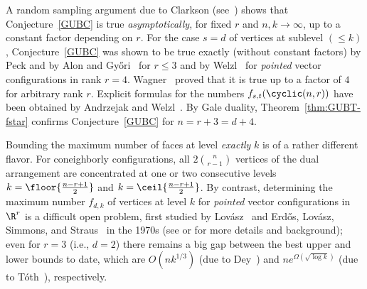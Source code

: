 A random sampling argument due to Clarkson (see~\cite{Clarkson:1989aa}) shows that Conjecture~\ref{GUBC} is true \emph{asymptotically}, for fixed $r$ and $n,k\to \infty$, up to a constant factor depending on $r$. For the case $s=d$ of vertices at sublevel $(\leq k)$, Conjecture~\ref{GUBC} was shown to be true exactly (without constant factors) by Peck \cite{Peck:1985aa} and by Alon and Gy\H{o}ri~\cite{Alon:1986aa} for $r\leq 3$ and by Welzl~\cite{Welzl:2001aa} for \emph{pointed} vector configurations in rank $r=4$.  Wagner~\cite{Wagner:2006aa} proved that it is true up to a factor of $4$ for arbitrary rank $r$. Explicit formulas for the numbers $f_{s,t}(\cyclic(n,r))$ %
have been obtained by Andrzejak and Welzl~\cite{Andrzejak:2003aa}. 
%
By Gale duality, Theorem~\ref{thm:GUBT-fstar} confirms Conjecture~\ref{GUBC} for $n=r+3=d+4$. 
%
\begin{remark} Bounding the maximum number of faces at level \emph{exactly} $k$ is of a rather different flavor. For coneighborly configurations, all $2\binom{n}{r-1}$ vertices of the dual arrangement are concentrated at one or two consecutive levels $k=\floor{\frac{n-r+1}{2}}$ and $k=\ceil{\frac{n-r+1}{2}}$. By contrast, determining the maximum number $f_{d,k}$ of vertices at level $k$ for \emph{pointed} vector configurations in $\R^r$ is a difficult open problem, first studied by Lov\'asz~\cite{Lovasz:1971aa} and Erd\H{o}s, Lov\'asz, Simmons, and Straus~\cite{Erdos:1973aa} in the 1970s (see \cite{Wagner:2008aa} or \cite[Ch.~11]{Matousek:2002aa} for more details and background); even for $r=3$ (i.e., $d=2$) there remains a big gap between the best upper and lower bounds to date, which are $O(nk^{1/3})$ (due to Dey~\cite{Dey:1998aa}) and $ne^{\Omega(\sqrt{\log k})}$ (due to T\'oth~\cite{Toth:2001aa}), respectively.
\end{remark}
%
%
